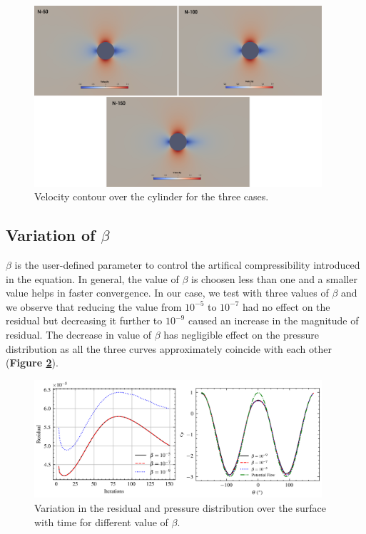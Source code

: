 \documentclass{article}
\begin{document}
\begin{figure}[H]
    \centering
    \includegraphics[width=0.95\textwidth]{../cyl_n.png}
    \caption{Velocity contour over the cylinder for the three cases.}
    \label{fig:cyl_n}
\end{figure}

\subsection{Variation of $\beta$}
$\beta$ is the user-defined parameter to control the artifical compressibility introduced in the equation. In general, the value of $\beta$ is choosen
less than one and a smaller value helps in faster convergence. In our case, we test with three values of $\beta$ and we observe that reducing the value
from $10^{-5}$ to $10^{-7}$ had no effect on the residual but decreasing it further to $10^{-9}$ caused an increase in the magnitude of residual.
The decrease in value of $\beta$ has negligible effect on the pressure distribution as all the three curves approximately coincide with each other
(\textbf{Figure \ref{fig:b}}).

\begin{figure}[H]
    \centering
    \includegraphics[width=0.95\textwidth]{../b.png}
    \caption{Variation in the residual and pressure distribution over the surface with time for different value of $\beta$.}
    \label{fig:b}
\end{figure}
\end{document}
